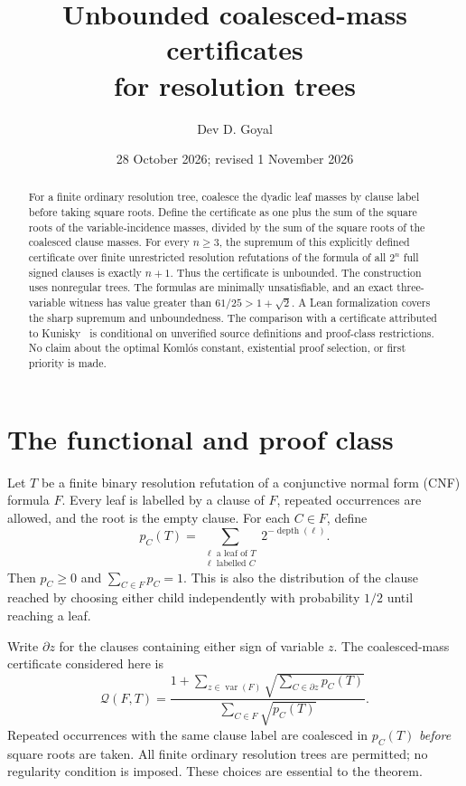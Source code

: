 \documentclass[11pt]{article}
\title{Unbounded coalesced-mass certificates\\for resolution trees}
\author{Dev D. Goyal}
\date{28 October 2026; revised 1 November 2026}
\newcommand{\Q}{\mathcal Q}\newcommand{\F}{\mathcal F}
\begin{document}
\maketitle

\begin{abstract}
For a finite ordinary resolution tree, coalesce the dyadic leaf masses
by clause label before taking square roots. Define the certificate as one
plus the sum of the square roots of the variable-incidence masses, divided
by the sum of the square roots of the coalesced clause masses. For every
$n\ge3$, the supremum of this explicitly defined certificate over finite
unrestricted resolution refutations of the formula of all $2^n$ full signed
clauses is exactly $n+1$. Thus the certificate is unbounded. The construction
uses nonregular trees. The formulas are minimally unsatisfiable, and an exact
three-variable witness has value greater than $61/25>1+\sqrt2$.
A Lean formalization covers the sharp supremum and unboundedness.
The comparison with a certificate attributed to Kunisky~\cite{kunisky} is conditional on
unverified source definitions and proof-class restrictions. No claim about
the optimal Koml\'os constant, existential proof selection, or first
priority is made.
\end{abstract}

\section{The functional and proof class}
Let $T$ be a finite binary resolution refutation of a conjunctive normal form (CNF) formula $F$. Every leaf is labelled by a clause of $F$, repeated occurrences are allowed, and the root is the empty clause. For each $C\in F$, define
\[
 p_C(T)=\sum_{\substack{\ell\text{ a leaf of }T\\\ell\text{ labelled }C}}2^{-\operatorname{depth}(\ell)}.
\]
Then $p_C\ge0$ and $\sum_{C\in F}p_C=1$. This is also the distribution of the clause reached by choosing either child independently with probability $1/2$ until reaching a leaf.

Write $\partial z$ for the clauses containing either sign of variable $z$. The coalesced-mass certificate considered here is
\begin{equation}\label{eq:objective}
 \Q(F,T)=\frac{1+\displaystyle\sum_{z\in\operatorname{var}(F)}
       \sqrt{\displaystyle\sum_{C\in\partial z}p_C(T)}}
       {\displaystyle\sum_{C\in F}\sqrt{p_C(T)}}.
\end{equation}
Repeated occurrences with the same clause label are coalesced in $p_C(T)$
\emph{before} square roots are taken. All finite ordinary resolution trees
are permitted; no regularity condition is imposed. These choices are
essential to the theorem.
\end{document}

